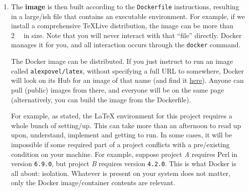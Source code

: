 \begin{enumerate}
        The Dockerfile this project uses for LaTeX stuff is here:
        \begin{center}
            \url{https://github.com/alexpovel/latex-extras-docker/blob/master/Dockerfile}
        \end{center}
        It is not as simple, so not as suited for an example.
        Its length gives you an idea of the setup required to compile this \LaTeX{} document.
        All of that complexity is of no concern to you when using Docker!
        Of course, such an image also works for much simpler documents.

        If you require custom additions, you can always inherit from existing base images:
        \begin{verbatim}
            FROM alexpovel/latex

            # ... Your stuff goes here ...
        \end{verbatim}
    \item The \textbf{image} is then built according to the \texttt{Dockerfile} instructions,
        resulting in a large\-/ish file that contains an executable environment.
        For example, if we install a comprehensive TeXLive distribution, the image can be
        more than \qty{2}{\giga\byte} in size.
        Note that you will never interact with that \enquote{file} directly.
        Docker manages it for you, and all interaction occurs through the \texttt{docker} command.

        The Docker image can be distributed.
        If you just instruct to run an image called  \texttt{alexpovel/latex}, without
        specifying a full URL to somewhere, Docker will look on its Hub for an image of that
        name (and find it \href{https://hub.docker.com/r/alexpovel/latex}{here}).
        Anyone can pull (public) images from there, and everyone will
        be on the same page (alternatively, you can build the image from the Dockerfile).

        For example, as stated, the \LaTeX{} environment for this project requires a whole bunch of setting\-/up.
        This can take more than an afternoon to read up upon, understand, implement and getting to run.
        In some cases, it will be impossible if some required part of a project conflicts
        with a pre\-/existing condition on your machine.
        For example, suppose project \emph{A} requires Perl in version \texttt{6.9.0},
        but project \emph{B} requires version \texttt{4.2.0}.
        This is what Docker is all about: isolation.
        Whatever is present on your system does not matter, only the Docker image/container
        contents are relevant.


\end{enumerate}
